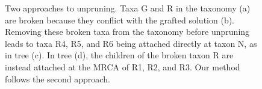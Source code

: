 \documentclass[fleqn,12pt,lineno,english]{wlpeerj}
\newcommand{\lyxdot}{.}
\begin{document}
\begin{figure}
\begin{centering}
\hfill{}\hfill{}
\par\end{centering}
\begin{centering}
\hfill{}
\par\end{centering}
\caption{\label{fig:Two-approaches-to-unpruning}Two approaches to unpruning.
Taxa G and R in the taxonomy (a) are broken because they conflict
with the grafted solution (b). Removing these broken taxa from the
taxonomy before unpruning leads to taxa R4, R5, and R6 being attached
directly at taxon N, as in tree (c). In tree (d), the children of
the broken taxon R are instead attached at the MRCA of R1, R2, and
R3. Our method follows the second approach.}
\end{figure}
\end{document}
